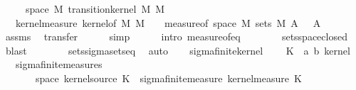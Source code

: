 \begin{isabellebody}
\ \ \ {\isachardoublequoteopen}{\isasymomega}\ {\isasymin}\ space\ M{\isachardoublequoteclose}\ {\isachardoublequoteopen}transition{\isacharunderscore}{\kern0pt}kernel\ M\ M{\isacharprime}{\kern0pt}\ {\isasymkappa}{\isachardoublequoteclose}\isanewline
\ \ \ {\isachardoublequoteopen}kernel{\isacharunderscore}{\kern0pt}measure\ {\isacharparenleft}{\kern0pt}kernel{\isacharunderscore}{\kern0pt}of\ M\ M{\isacharprime}{\kern0pt}\ {\isasymkappa}{\isacharparenright}{\kern0pt}\ {\isasymomega}\ {\isacharequal}{\kern0pt}\ measure{\isacharunderscore}{\kern0pt}of\ {\isacharparenleft}{\kern0pt}space\ M{\isacharprime}{\kern0pt}{\isacharparenright}{\kern0pt}\ {\isacharparenleft}{\kern0pt}sets\ M{\isacharprime}{\kern0pt}{\isacharparenright}{\kern0pt}\ {\isacharparenleft}{\kern0pt}{\isasymlambda}A{\isacharprime}{\kern0pt}{\isachardot}{\kern0pt}\ {\isasymkappa}\ {\isasymomega}\ A{\isacharprime}{\kern0pt}{\isacharparenright}{\kern0pt}{\isachardoublequoteclose}\isanewline
%
\isadelimproof
\ \ %
\endisadelimproof
%
\isatagproof
{}\isamarkupfalse%
\ assms\ \isamarkupfalse%
\ transfer\isanewline
\ \ \ \ \isamarkupfalse%
\ simp\isanewline
\ \ \ \ \isamarkupfalse%
\ {\isacharparenleft}{\kern0pt}intro\ measure{\isacharunderscore}{\kern0pt}of{\isacharunderscore}{\kern0pt}eq{\isacharparenright}{\kern0pt}\isanewline
\ \ \ \ \ \ \isamarkupfalse%
\ sets{\isachardot}{\kern0pt}space{\isacharunderscore}{\kern0pt}closed\ \isamarkupfalse%
\ blast\isanewline
\ \ \ \ \ \ \isamarkupfalse%
\ sets{\isachardot}{\kern0pt}sigma{\isacharunderscore}{\kern0pt}sets{\isacharunderscore}{\kern0pt}eq\ \isamarkupfalse%
\ auto\isanewline
\ \ \isamarkupfalse%
%
\endisatagproof
{\isafoldproof}%
%
\isadelimproof
\isanewline
%
\endisadelimproof
\isanewline
{}\isamarkupfalse%
\ sigma{\isacharunderscore}{\kern0pt}finite{\isacharunderscore}{\kern0pt}kernel\ {\isacharequal}{\kern0pt}\isanewline
\ \ \ K\ {\isacharcolon}{\kern0pt}{\isacharcolon}{\kern0pt}\ {\isachardoublequoteopen}{\isacharparenleft}{\kern0pt}{\isacharprime}{\kern0pt}a{\isacharcomma}{\kern0pt}\ {\isacharprime}{\kern0pt}b{\isacharparenright}{\kern0pt}\ kernel{\isachardoublequoteclose}\isanewline
\ \ \ sigma{\isacharunderscore}{\kern0pt}finite{\isacharunderscore}{\kern0pt}measures{\isacharcolon}{\kern0pt}\isanewline
\ \ \ \ {\isachardoublequoteopen}{\isasymAnd}{\isasymomega}{\isachardot}{\kern0pt}\ {\isasymomega}\ {\isasymin}\ space\ {\isacharparenleft}{\kern0pt}kernel{\isacharunderscore}{\kern0pt}source\ K{\isacharparenright}{\kern0pt}\ {\isasymLongrightarrow}\ sigma{\isacharunderscore}{\kern0pt}finite{\isacharunderscore}{\kern0pt}measure\ {\isacharparenleft}{\kern0pt}kernel{\isacharunderscore}{\kern0pt}measure\ K\ {\isasymomega}{\isacharparenright}{\kern0pt}{\isachardoublequoteclose}\isanewline

\end{isabellebody}

